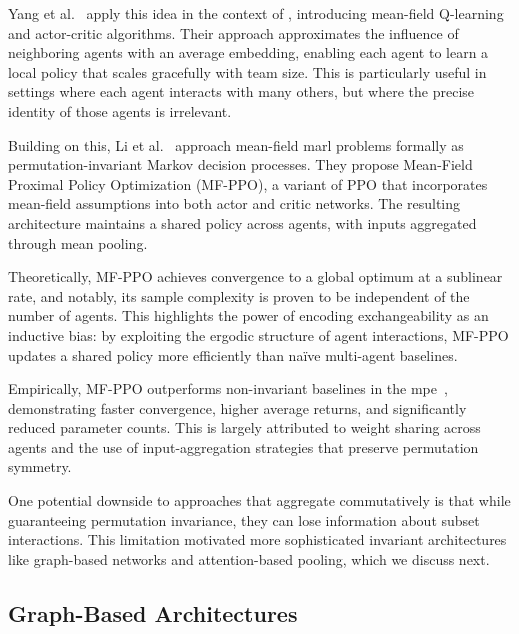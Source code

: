 \documentclass{article}
\begin{document}
Yang et al.~\cite{yang2018} apply this idea in the context of , 
introducing mean-field Q-learning and actor-critic algorithms. 
Their approach approximates the influence of neighboring agents with 
an average embedding, enabling each agent to learn a local policy that 
scales gracefully with team size. This is particularly 
useful in settings where each agent interacts with many others, 
but where the precise identity of those agents is irrelevant.

Building on this, Li et al.~\cite{li2021b} approach mean-field \gls{marl} 
problems formally as permutation-invariant Markov decision processes. 
They propose Mean-Field Proximal Policy Optimization (MF-PPO), 
a variant of PPO that incorporates mean-field assumptions into 
both actor and critic networks. The resulting architecture maintains a 
shared policy across agents, with inputs aggregated through mean pooling.

Theoretically, MF-PPO achieves convergence to a global optimum at 
a sublinear rate, and notably, its sample complexity is proven to be 
independent of the number of agents. This highlights the power of 
encoding exchangeability as an inductive bias: by exploiting the 
ergodic structure of agent interactions, MF-PPO updates a shared policy 
more efficiently than na\"ive multi-agent baselines.

Empirically, MF-PPO outperforms non-invariant baselines in the 
\gls{mpe}~\cite{li2021b}, demonstrating faster convergence, 
higher average returns, and significantly reduced parameter counts. 
This is largely attributed to weight sharing across agents and the 
use of input-aggregation strategies that preserve permutation symmetry. 

One potential downside to approaches that aggregate commutatively
is that while guaranteeing permutation invariance, 
they can lose information about subset interactions. 
This limitation motivated more sophisticated invariant architectures like 
graph-based networks and attention-based pooling, which we discuss next.


\subsection{Graph-Based Architectures}
\end{document}
